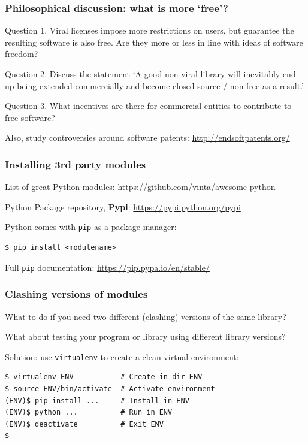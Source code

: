 \documentclass{beamer} %
\newcommand\emc[1]{\textcolor{brightblue}{\textbf{#1}}}
\begin{document}
\begin{frame}

\frametitle{Philosophical discussion: what is more `free'?}

Question 1. Viral licenses impose more restrictions on users, but guarantee the resulting software is also free. Are they more or less in line with ideas of software freedom?

\vspace{5mm}

Question 2. Discuss the statement `A good non-viral library will inevitably end up being extended commercially and become closed source / non-free as a result.'

\vspace{5mm}

Question 3. What incentives are there for commercial entities to contribute to free software?

\vspace{5mm}
Also, study controversies around software patents: \url{http://endsoftpatents.org/}

\end{frame}

\begin{frame}[fragile]

\frametitle{Installing 3rd party modules}

List of great Python modules: \url{https://github.com/vinta/awesome-python}

Python Package repository, \emc{Pypi}: \url{https://pypi.python.org/pypi}

\vspace{3mm}
Python comes with \texttt{pip} as a package manager:
\begin{verbatim}
$ pip install <modulename>
\end{verbatim}
Full \texttt{pip} documentation: \url{https://pip.pypa.io/en/stable/}

\end{frame}


\begin{frame}[fragile]

\frametitle{Clashing versions of modules}

What to do if you need two different (clashing) versions of the same library?

What about testing your program or library using different library versions?

\vspace{5mm}
Solution: use \texttt{virtualenv} to create a clean virtual environment:
\begin{small}
\begin{verbatim}
$ virtualenv ENV           # Create in dir ENV
$ source ENV/bin/activate  # Activate environment
(ENV)$ pip install ...     # Install in ENV
(ENV)$ python ...          # Run in ENV
(ENV)$ deactivate          # Exit ENV
$
\end{verbatim}
\end{small}

\end{frame}
\end{document}
